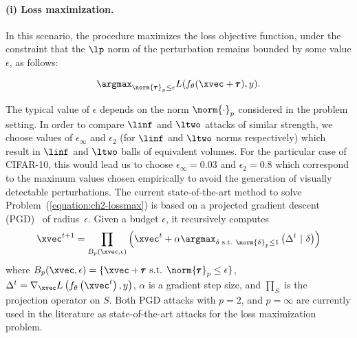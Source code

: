 \paragraph{(i) Loss maximization.}
In this scenario, the procedure maximizes the loss objective function, under the constraint that the $\lp$ norm of the perturbation remains bounded by some value $\epsilon$, as follows:  

\begin{equation}
  \argmax_{\norm{\pmb{\tau}}_p \leq \epsilon} L(f_\theta(\xvec + \pmb{\tau}),y).
  \label{equation:ch2-lossmax}
\end{equation}

The typical value of $\epsilon$ depends on the norm $\norm{\cdot}_p$ considered in the problem setting.
In order to compare $\linf$ and $\ltwo$ attacks of similar strength, we choose values of $\epsilon_\infty$ and $\epsilon_2$ (for $\linf$ and $\ltwo$ norms respectively) which result in $\linf$ and $\ltwo$ balls of equivalent volumes.
For the particular case of CIFAR-10, this would lead us to choose $\epsilon_\infty = 0.03$ and $\epsilon_2 = 0.8$ which correspond to the maximum values chosen empirically to avoid the generation of visually detectable perturbations. 
The current state-of-the-art method to solve Problem~(\ref{equation:ch2-lossmax}) is based on a projected gradient descent (PGD)~\cite{madry2018towards} of radius~$\epsilon$. Given a budget $\epsilon$, it recursively computes
\begin{equation}
    \xvec^{t+1}=\prod_{B_p(\xvec,\epsilon)}\left(\xvec^t
    +\alpha \argmax_{\delta \text{ s.t. } \norm{\delta}_p \leq 1} \left( \Delta^t \ |\ \delta \right)\right)
    \label{equation:ch2-projectionPGD}
\end{equation}
where $B_p(\xvec,\epsilon) = \{ \xvec + \pmb{\tau} \text{ s.t. } \norm{\pmb{\tau}}_p \leq \epsilon\}$, $\Delta^t = \nabla_\xvec L\left( f_\theta \left(\xvec^t \right), y \right)$, $\alpha$ is a gradient step size, and $\prod_S$ is the projection operator on $S$. Both PGD attacks with $p=2$, and $p=\infty$ are currently used in the literature as state-of-the-art attacks for the loss maximization problem. 


